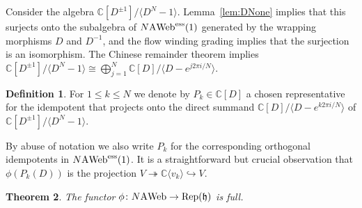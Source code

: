 \documentclass[11pt]{article}
\newtheorem{theo}{Theorem}[section]
\theoremstyle{definition}
\newtheorem{defi}[theo]{Definition}
\numberwithin{equation}{section}
\def\C{{\mathbb C}}
\newcommand{\reph}{\Rep(\h)}
\def\h{{\mathfrak h}}
\newcommand{\Rep}{\cat{Rep}}
\newcommand{\cat}[1]{\ensuremath{\mbox{\bfseries {\upshape {#1}}}}}
\newcommand{\wrap}{D}
\newcommand{\AWeb}[1][]{#1\cat{A}\cat{Web}}
\newcommand{\essAWeb}[1][]{#1\AWeb^{\mathrm{ess}}}
\def\la{\langle}
\def\ra{\rangle}
\begin{document}
Consider the algebra $\C[\wrap^{\pm 1}]/\la \wrap^N-1\ra$. Lemma~\ref{lem:DNone}
implies that this surjects onto the subalgebra of $\essAWeb[N](1)$ generated by
the wrapping morphisms $D$ and $D^{-1}$, and the flow winding grading implies that the surjection is an
isomorphism. The Chinese remainder theorem implies $\C[\wrap^{\pm 1}]/\la
\wrap^N-1\ra\cong \bigoplus_{j=1}^N \C[\wrap]/\la \wrap-e^{j 2 \pi i /N}\ra$.

\begin{defi} \label{def:Pk} For $1\leq k\leq N$ we denote by $P_k\in
\C[\wrap]$ a chosen representative for the idempotent that projects onto the
direct summand $\C[\wrap]/\la \wrap-e^{k 2 \pi i /N}\ra$ of $\C[\wrap^{\pm
1}]/\la \wrap^N-1\ra$.
\end{defi}
By abuse of notation we also write $P_k$ for the corresponding orthogonal idempotents in
$\essAWeb[N](1)$. It is a straightforward but crucial observation that
$\phi(P_k(\wrap))$ is the projection $V\twoheadrightarrow \C\la v_k\ra
\hookrightarrow V$. 


\begin{theo} \label{thm:fullness}
  The functor $\phi\colon \AWeb[N]\to \reph$ is full. 
\end{theo}
\end{document}
